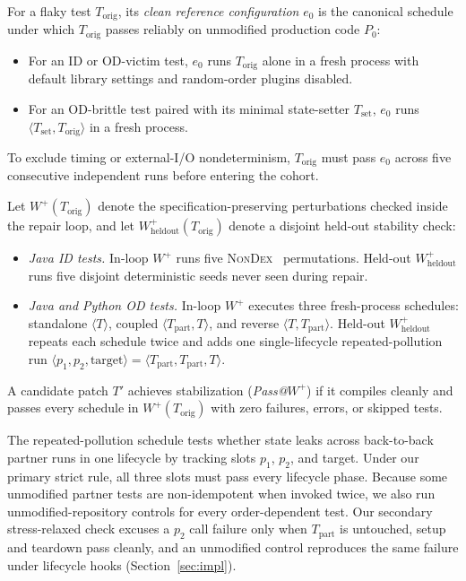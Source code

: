 \begin{definition}
\label{def:e0}
For a flaky test $T_{\text{orig}}$, its \emph{clean reference configuration} $e_0$ is the canonical schedule under which $T_{\text{orig}}$ passes reliably on unmodified production code $P_0$:
\begin{itemize}[nosep]
    \item For an ID or OD-victim test, $e_0$ runs $T_{\text{orig}}$ alone in a fresh process with default library settings and random-order plugins disabled.
    \item For an OD-brittle test paired with its minimal state-setter $T_{\text{set}}$, $e_0$ runs $\langle T_{\text{set}}, T_{\text{orig}} \rangle$ in a fresh process.
\end{itemize}
To exclude timing or external-I/O nondeterminism, $T_{\text{orig}}$ must pass $e_0$ across five consecutive independent runs before entering the cohort.
\end{definition}

\begin{definition}
\label{def:w_plus}
Let $W^+(T_{\text{orig}})$ denote the specification-preserving perturbations checked inside the repair loop, and let $W^+_{\text{heldout}}(T_{\text{orig}})$ denote a disjoint held-out stability check:
\begin{itemize}[nosep]
    \item \emph{Java ID tests.} In-loop $W^+$ runs five \textsc{NonDex}~\cite{gyori2016nondex} permutations. Held-out $W^+_{\text{heldout}}$ runs five disjoint deterministic seeds never seen during repair.
    \item \emph{Java and Python OD tests.} In-loop $W^+$ executes three fresh-process schedules: standalone $\langle T \rangle$, coupled $\langle T_{\text{part}}, T \rangle$, and reverse $\langle T, T_{\text{part}} \rangle$. Held-out $W^+_{\text{heldout}}$ repeats each schedule twice and adds one single-lifecycle repeated-pollution run $\langle p_1, p_2, \text{target} \rangle = \langle T_{\text{part}}, T_{\text{part}}, T \rangle$.
\end{itemize}
A candidate patch $T'$ achieves stabilization (\emph{Pass@$W^+$}) if it compiles cleanly and passes every schedule in $W^+(T_{\text{orig}})$ with zero failures, errors, or skipped tests.
\end{definition}

The repeated-pollution schedule tests whether state leaks across back-to-back partner runs in one lifecycle by tracking slots $p_1$, $p_2$, and target. Under our primary strict rule, all three slots must pass every lifecycle phase. Because some unmodified partner tests are non-idempotent when invoked twice, we also run unmodified-repository controls for every order-dependent test. Our secondary stress-relaxed check excuses a $p_2$ call failure only when $T_{\text{part}}$ is untouched, setup and teardown pass cleanly, and an unmodified control reproduces the same failure under lifecycle hooks (Section~\ref{sec:impl}).


